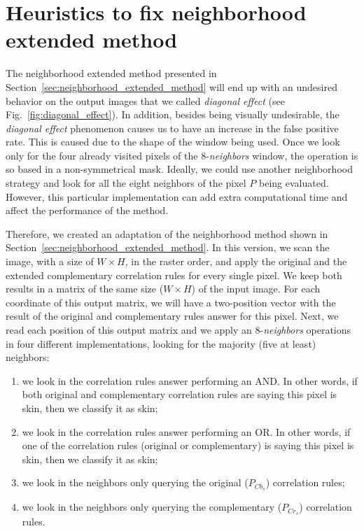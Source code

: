 \section{Heuristics to fix neighborhood extended method}
\label{sec:sup_neighborhood_operations}
The neighborhood extended method presented in Section~\ref{sec:neighborhood_extended_method} will end up with an undesired behavior on the output images that we called \textit{diagonal effect} (see Fig.~\ref{fig:diagonal_effect}). In addition, besides being visually undesirable, the \textit{diagonal effect} phenomenon causes us to have an increase in the false positive rate. This is caused due to the shape of the window being used. Once we look only for the four already visited pixels of the 8-\textit{neighbors} window, the operation is so based in a non-symmetrical mask. Ideally, we could use another neighborhood strategy and look for all the eight neighbors of the pixel $P$ being evaluated. However, this particular implementation can add extra computational time and affect the performance of the method. 

Therefore, we created an adaptation of the neighborhood method shown in Section~\ref{sec:neighborhood_extended_method}. In this version, we scan the image, with a size of $W \times H$, in the raster order, and apply the original and the extended complementary correlation rules for every single pixel. We keep both results in a matrix of the same size ($W \times H$) of the input image. For each coordinate of this output matrix, we will have a two-position vector with the result of the original and complementary rules answer for this pixel. Next, we read each position of this output matrix and we apply an 8-\textit{neighbors} operations in four different implementations, looking for the majority (five at least) neighbors:

\begin{enumerate}[label={(\arabic*)}]
    \item we look in the correlation rules answer performing an AND. In other words, if both original and complementary correlation rules are saying this pixel is skin, then we classify it as skin;
    \item we look in the correlation rules answer performing an OR. In other words, if one of the correlation rules (original or complementary) is saying this pixel is skin, then we classify it as skin;
    \item we look in the neighbors only querying the original ($P_{Cb_s}$) correlation rules;
    \item we look in the neighbors only querying the complementary ($P_{Cr_s}$) correlation rules.
\end{enumerate}

